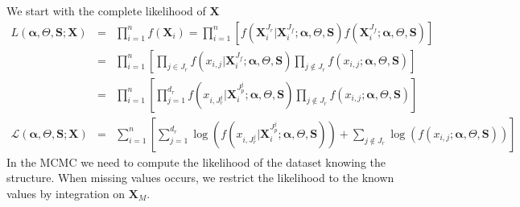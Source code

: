 \documentclass[12pt,a4paper]{report}
\begin{document}
We start with the complete likelihood of $\boldsymbol{X}$
\begin{eqnarray}
	L(\boldsymbol{\alpha},\Theta,\boldsymbol{S};\boldsymbol{X})&=& \prod_{i=1}^n f(\boldsymbol{X}_i)= \prod_{i=1}^n\left[f(\boldsymbol{X}_i^{J_r}|\boldsymbol{X}_i^{J_f};\boldsymbol{\alpha},\Theta,\boldsymbol{S})f(\boldsymbol{X}_i^{J_f};\boldsymbol{\alpha},\Theta,\boldsymbol{S}) \right] \\
	&=&\prod_{i=1}^n\left[\prod_{j \in J_r}f(x_{i,j}|\boldsymbol{X}_i^{J_f};\boldsymbol{\alpha},\Theta,\boldsymbol{S})\prod_{j \notin J_r} f(x_{i,j};\boldsymbol{\alpha},\Theta,\boldsymbol{S}) \right] \\
	&=&\prod_{i=1}^n\left[\prod_{j =1}^{d_r}f(x_{i,J_r^j}|\boldsymbol{X}_i^{J_p^j};\boldsymbol{\alpha},\Theta,\boldsymbol{S})\prod_{j \notin J_r} f(x_{i,j};\boldsymbol{\alpha},\Theta,\boldsymbol{S}) \right] \\
	\mathcal{L}(\boldsymbol{\alpha},\Theta,\boldsymbol{S};\boldsymbol{X})&=&\sum_{i=1}^n\left[\sum_{j =1}^{d_r}\log \left(f(x_{i,J_r^j}|\boldsymbol{X}_i^{J_p^j};\boldsymbol{\alpha},\Theta,\boldsymbol{S})\right)+\sum_{j \notin J_r} \log \left(f(x_{i,j};\boldsymbol{\alpha},\Theta,\boldsymbol{S})\right) \right] \label{loglikmiss}
\end{eqnarray}
		In the MCMC we need to compute the likelihood of the dataset knowing the structure. When missing values occurs, we restrict the likelihood to the known values by integration on $\boldsymbol{X}_M$.
				 		
\end{document}
